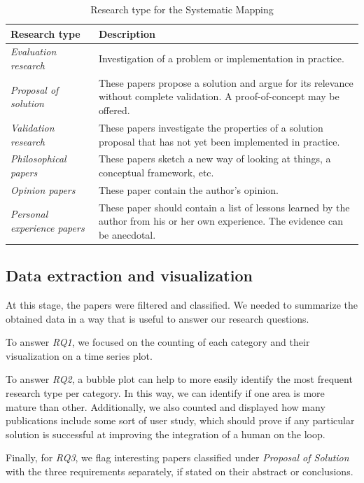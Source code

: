 \begin{table}[hptb]
  \small
  \begin{tabularx}{\textwidth}{l >{\raggedright\arraybackslash}X}
    \hline
    \textbf{Research type} & \textbf{Description} \\
    \hline
    \textit{Evaluation research} & Investigation of a problem or implementation in practice. \\
    \textit{Proposal of solution} & These papers propose a solution and argue for its relevance without
      complete validation. A proof-of-concept may be offered. \\
    \textit{Validation research} & These papers investigate the properties of a solution proposal that
      has not yet been implemented in practice. \\
    \textit{Philosophical papers} & These papers sketch a new way of looking at things, a conceptual
      framework, etc. \\
    \textit{Opinion papers} & These paper contain the author's opinion. \\
    \textit{Personal experience papers} & These paper should contain a list of lessons learned by the
      author from his or her own experience. The evidence can be anecdotal. \\
  \end{tabularx}
  \caption{Research type for the Systematic Mapping}\label{tab:mapping/research_type}
\end{table}

\subsection{Data extraction and visualization}
At this stage, the papers were filtered and classified. We needed to summarize
the obtained data in a way that is useful to answer our research questions.

To answer \emph{RQ1}, we focused on the counting of each category
and their visualization on a time series plot.

To answer \emph{RQ2}, a bubble plot can help to more easily identify
the most frequent research type per category. In this way, we can identify if
one area is more mature than other. Additionally, we also counted and displayed
how many publications include some sort of user study, which should prove
if any particular solution is successful at improving the integration of a
human on the loop.

Finally, for \emph{RQ3}, we flag interesting papers classified under
\emph{Proposal of Solution} with the three requirements separately, if stated
on their abstract or conclusions.

